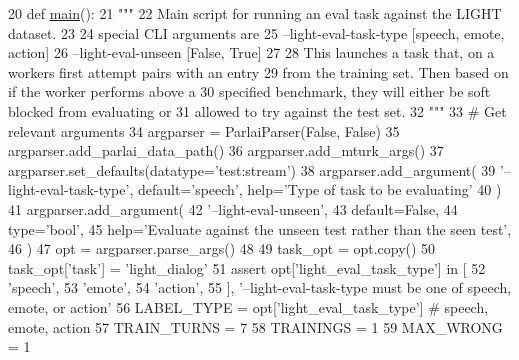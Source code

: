 \begin{DoxyCode}
20 \textcolor{keyword}{def }\hyperlink{namespaceprojects_1_1wizard__of__wikipedia_1_1mturk__evaluation__task_1_1run_ad3ab2c71f8083c3112815c0b363d316b}{main}():
21     \textcolor{stringliteral}{"""}
22 \textcolor{stringliteral}{    Main script for running an eval task against the LIGHT dataset.}
23 \textcolor{stringliteral}{}
24 \textcolor{stringliteral}{    special CLI arguments are}
25 \textcolor{stringliteral}{      --light-eval-task-type [speech, emote, action]}
26 \textcolor{stringliteral}{      --light-eval-unseen [False, True]}
27 \textcolor{stringliteral}{}
28 \textcolor{stringliteral}{    This launches a task that, on a workers first attempt pairs with an entry}
29 \textcolor{stringliteral}{    from the training set. Then based on if the worker performs above a}
30 \textcolor{stringliteral}{    specified benchmark, they will either be soft blocked from evaluating or}
31 \textcolor{stringliteral}{    allowed to try against the test set.}
32 \textcolor{stringliteral}{    """}
33     \textcolor{comment}{# Get relevant arguments}
34     argparser = ParlaiParser(\textcolor{keyword}{False}, \textcolor{keyword}{False})
35     argparser.add\_parlai\_data\_path()
36     argparser.add\_mturk\_args()
37     argparser.set\_defaults(datatype=\textcolor{stringliteral}{'test:stream'})
38     argparser.add\_argument(
39         \textcolor{stringliteral}{'--light-eval-task-type'}, default=\textcolor{stringliteral}{'speech'}, help=\textcolor{stringliteral}{'Type of task to be evaluating'}
40     )
41     argparser.add\_argument(
42         \textcolor{stringliteral}{'--light-eval-unseen'},
43         default=\textcolor{keyword}{False},
44         type=\textcolor{stringliteral}{'bool'},
45         help=\textcolor{stringliteral}{'Evaluate against the unseen test rather than the seen test'},
46     )
47     opt = argparser.parse\_args()
48 
49     task\_opt = opt.copy()
50     task\_opt[\textcolor{stringliteral}{'task'}] = \textcolor{stringliteral}{'light\_dialog'}
51     \textcolor{keyword}{assert} opt[\textcolor{stringliteral}{'light\_eval\_task\_type'}] \textcolor{keywordflow}{in} [
52         \textcolor{stringliteral}{'speech'},
53         \textcolor{stringliteral}{'emote'},
54         \textcolor{stringliteral}{'action'},
55     ], \textcolor{stringliteral}{'--light-eval-task-type must be one of speech, emote, or action'}
56     LABEL\_TYPE = opt[\textcolor{stringliteral}{'light\_eval\_task\_type'}]  \textcolor{comment}{# speech, emote, action}
57     TRAIN\_TURNS = 7
58     TRAININGS = 1
59     MAX\_WRONG = 1

\end{DoxyCode}

